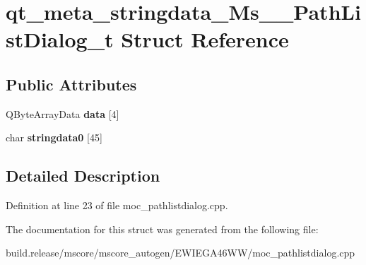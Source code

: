 \hypertarget{structqt__meta__stringdata___ms_____path_list_dialog__t}{}\section{qt\+\_\+meta\+\_\+stringdata\+\_\+\+Ms\+\_\+\+\_\+\+Path\+List\+Dialog\+\_\+t Struct Reference}
\label{structqt__meta__stringdata___ms_____path_list_dialog__t}
\subsection*{Public Attributes}
\begin{DoxyCompactItemize}
\item 
\mbox{\label{structqt__meta__stringdata___ms_____path_list_dialog__t_a65a1174a8f0d5684eee6b45280628417}} 
Q\+Byte\+Array\+Data {\bfseries data} \mbox{[}4\mbox{]}
\item 
\mbox{\label{structqt__meta__stringdata___ms_____path_list_dialog__t_a003809a8b549bb88da7f7467f9404432}} 
char {\bfseries stringdata0} \mbox{[}45\mbox{]}
\end{DoxyCompactItemize}


\subsection{Detailed Description}


Definition at line 23 of file moc\+\_\+pathlistdialog.\+cpp.



The documentation for this struct was generated from the following file\+:\begin{DoxyCompactItemize}
\item 
build.\+release/mscore/mscore\+\_\+autogen/\+E\+W\+I\+E\+G\+A46\+W\+W/moc\+\_\+pathlistdialog.\+cpp\end{DoxyCompactItemize}
